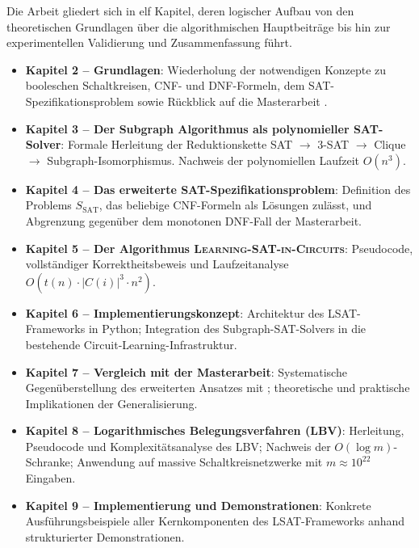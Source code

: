 ﻿\documentclass[a4paper,12pt]{article}
\theoremstyle{definition}
\begin{document}
Die Arbeit gliedert sich in elf Kapitel, deren logischer Aufbau von den theoretischen
Grundlagen über die algorithmischen Hauptbeiträge bis hin zur experimentellen Validierung
und Zusammenfassung führt.

\begin{itemize}
    \item[-] \textbf{Kapitel 2 -- Grundlagen}: Wiederholung der notwendigen Konzepte zu
      booleschen Schaltkreisen, CNF- und DNF-Formeln, dem SAT-Spezifikationsproblem sowie
      Rückblick auf die Masterarbeit \cite{Epp13}.

    \item[-] \textbf{Kapitel 3 -- Der Subgraph Algorithmus als polynomieller SAT-Solver}:
      Formale Herleitung der Reduktionskette SAT $\to$ 3-SAT $\to$ Clique $\to$
      Subgraph-Isomorphismus.  Nachweis der polynomiellen Laufzeit $O(n^3)$.

    \item[-] \textbf{Kapitel 4 -- Das erweiterte SAT-Spezifikationsproblem}: Definition
      des Problems $S_{\text{SAT}}$, das beliebige CNF-Formeln als Lösungen zulässt, und
      Abgrenzung gegenüber dem monotonen DNF-Fall der Masterarbeit.

    \item[-] \textbf{Kapitel 5 -- Der Algorithmus \textsc{Learning-SAT-in-Circuits}}:
      Pseudocode, vollstän\-diger Korrektheitsbeweis und Laufzeitanalyse
      $O(t(n) \cdot |C(i)|^3 \cdot n^2)$.

    \item[-] \textbf{Kapitel 6 -- Implementierungskonzept}: Architektur des LSAT-Frameworks
      in Python; Integration des Subgraph-SAT-Solvers in die bestehende
      Circuit-Learning-Infrastruktur.

    \item[-] \textbf{Kapitel 7 -- Vergleich mit der Masterarbeit}: Systematische
      Gegenüberstellung des erweiterten Ansatzes mit \cite{Epp13}; theoretische und
      praktische Implikationen der Generalisierung.

    \item[-] \textbf{Kapitel 8 -- Logarithmisches Belegungsverfahren (LBV)}: Herleitung,
      Pseudocode und Komplexitätsanalyse des LBV; Nachweis der $O(\log m)$-Schranke;
      Anwendung auf massive Schaltkreisnetzwerke mit $m \approx 10^{22}$ Eingaben.

    \item[-] \textbf{Kapitel 9 -- Implementierung und Demonstrationen}: Konkrete
      Ausführungsbei\-spiele aller Kernkomponenten des LSAT-Frameworks anhand
      strukturierter Demonstrationen.


\end{itemize}
\end{document}
